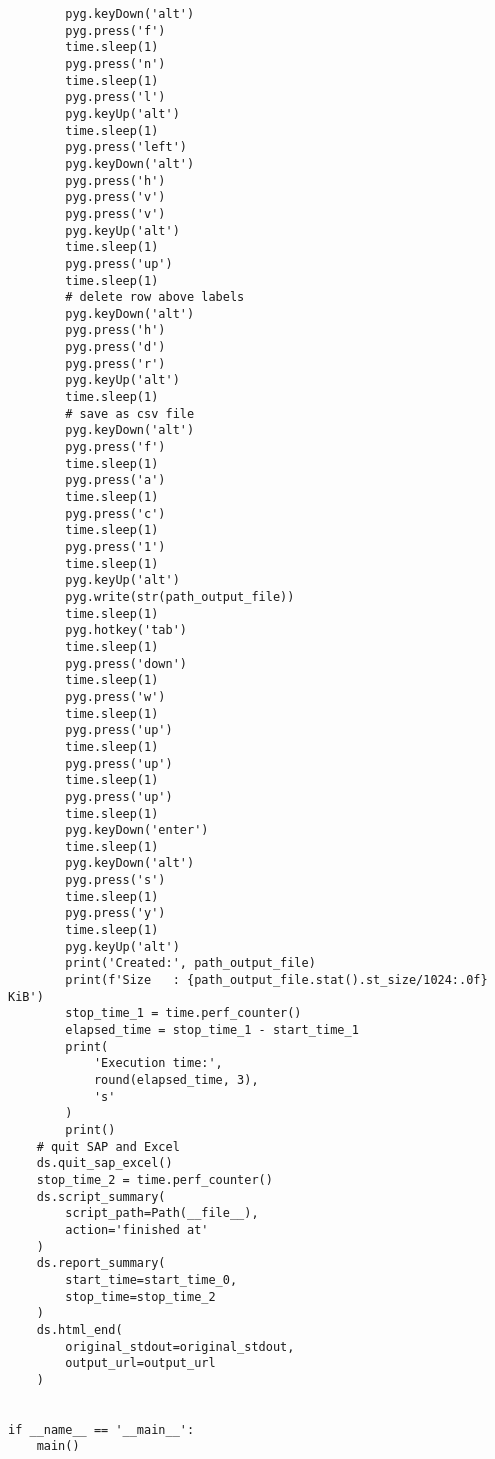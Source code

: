 \documentclass[10pt, letterpaper, twoside]{article}
\begin{document}
\begin{footnotesize}
\begin{verbatim}
        pyg.keyDown('alt')
        pyg.press('f')
        time.sleep(1)
        pyg.press('n')
        time.sleep(1)
        pyg.press('l')
        pyg.keyUp('alt')
        time.sleep(1)
        pyg.press('left')
        pyg.keyDown('alt')
        pyg.press('h')
        pyg.press('v')
        pyg.press('v')
        pyg.keyUp('alt')
        time.sleep(1)
        pyg.press('up')
        time.sleep(1)
        # delete row above labels
        pyg.keyDown('alt')
        pyg.press('h')
        pyg.press('d')
        pyg.press('r')
        pyg.keyUp('alt')
        time.sleep(1)
        # save as csv file
        pyg.keyDown('alt')
        pyg.press('f')
        time.sleep(1)
        pyg.press('a')
        time.sleep(1)
        pyg.press('c')
        time.sleep(1)
        pyg.press('1')
        time.sleep(1)
        pyg.keyUp('alt')
        pyg.write(str(path_output_file))
        time.sleep(1)
        pyg.hotkey('tab')
        time.sleep(1)
        pyg.press('down')
        time.sleep(1)
        pyg.press('w')
        time.sleep(1)
        pyg.press('up')
        time.sleep(1)
        pyg.press('up')
        time.sleep(1)
        pyg.press('up')
        time.sleep(1)
        pyg.keyDown('enter')
        time.sleep(1)
        pyg.keyDown('alt')
        pyg.press('s')
        time.sleep(1)
        pyg.press('y')
        time.sleep(1)
        pyg.keyUp('alt')
        print('Created:', path_output_file)
        print(f'Size   : {path_output_file.stat().st_size/1024:.0f} KiB')
        stop_time_1 = time.perf_counter()
        elapsed_time = stop_time_1 - start_time_1
        print(
            'Execution time:',
            round(elapsed_time, 3),
            's'
        )
        print()
    # quit SAP and Excel
    ds.quit_sap_excel()
    stop_time_2 = time.perf_counter()
    ds.script_summary(
        script_path=Path(__file__),
        action='finished at'
    )
    ds.report_summary(
        start_time=start_time_0,
        stop_time=stop_time_2
    )
    ds.html_end(
        original_stdout=original_stdout,
        output_url=output_url
    )


if __name__ == '__main__':
    main()
\end{verbatim}
\end{footnotesize}
\end{document}
